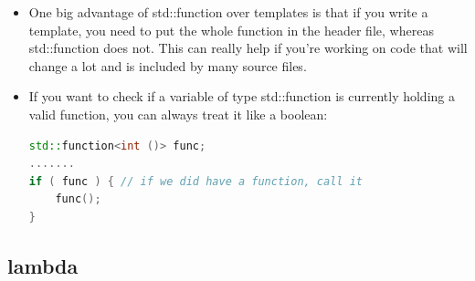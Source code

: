 \documentclass[a4paper,12pt,twoside]{book}
\begin{document}
\begin{itemize}
\item One big advantage of std::function over templates is that if you write a template, you need to put the whole function in the header file, whereas std::function does not. This can really help if you're working on code that will change a lot and is included by many source files.

\item If you want to check if a variable of type std::function is currently holding a valid function, you can always treat it like a boolean:
\begin{lstlisting}[frame=single, language=c++]
std::function<int ()> func;
.......
if ( func ) { // if we did have a function, call it
    func();
}
\end{lstlisting}
\end{itemize}

\subsection{lambda}
\end{document}
